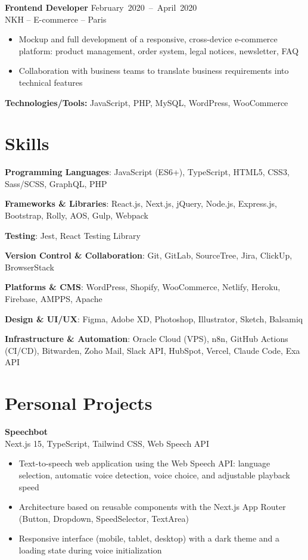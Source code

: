 \documentclass[9pt,a4paper]{extarticle}
\newcommand{\secgap}{\vspace{0.8em}}
\newcommand{\entry}[3]{%
  \vspace{0.25em}%
  {\bfseries #1} \hfill {\color{grey}\footnotesize\mbox{#2}}\\[-1pt]
  {\color{accent}\footnotesize #3}\par\vspace{0.1em}%
}
\newcommand{\skill}[2]{\textbf{#1}: #2\par\vspace{1.5pt}}
\begin{document}
{\begin{minipage}[t]{0.488\textwidth}
\entry{Frontend Developer}{February 2020 -- April 2020}{NKH -- E-commerce -- Paris}
\begin{itemize}
  \item Mockup and full development of a responsive, cross-device e-commerce platform: product management, order system, legal notices, newsletter, FAQ
  \item Collaboration with business teams to translate business requirements into technical features
\end{itemize}
{\footnotesize\textbf{Technologies/Tools:} JavaScript, PHP, MySQL, WordPress, WooCommerce}
\end{minipage}}%
\noindent\usebox{\leftcol}%
\hfill
\begin{minipage}[t]{0.488\textwidth}
\section{Skills}
\skill{Programming Languages}{JavaScript (ES6+), TypeScript, HTML5, CSS3, Sass/SCSS, GraphQL, PHP}
\skill{Frameworks \& Libraries}{React.js, Next.js, jQuery, Node.js, Express.js, Bootstrap, Rolly, AOS, Gulp, Webpack}
\skill{Testing}{Jest, React Testing Library}
\skill{Version Control \& Collaboration}{Git, GitLab, SourceTree, Jira, ClickUp, BrowserStack}
\skill{Platforms \& CMS}{WordPress, Shopify, WooCommerce, Netlify, Heroku, Firebase, AMPPS, Apache}
\skill{Design \& UI/UX}{Figma, Adobe XD, Photoshop, Illustrator, Sketch, Balsamiq}
\skill{Infrastructure \& Automation}{Oracle Cloud (VPS), n8n, GitHub Actions (CI/CD), Bitwarden, Zoho Mail, Slack API, HubSpot, Vercel, Claude Code, Exa API}

\secgap
\section{Personal Projects}
\entry{Speechbot}{}{Next.js 15, TypeScript, Tailwind CSS, Web Speech API}
\begin{itemize}
  \item Text-to-speech web application using the Web Speech API: language selection, automatic voice detection, voice choice, and adjustable playback speed
  \item Architecture based on reusable components with the Next.js App Router (Button, Dropdown, SpeedSelector, TextArea)
  \item Responsive interface (mobile, tablet, desktop) with a dark theme and a loading state during voice initialization
\end{itemize}


\end{minipage}
\end{document}

